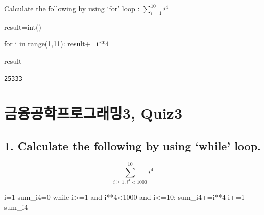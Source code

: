 \documentclass[
  letterpaper,
  DIV=11,
  numbers=noendperiod]{scrreprt}
\newenvironment{Shaded}{\begin{snugshade}}{\end{snugshade}}
\newcommand{\BuiltInTok}[1]{\textcolor[rgb]{0.00,0.23,0.31}{#1}}
\newcommand{\ControlFlowTok}[1]{\textcolor[rgb]{0.00,0.23,0.31}{#1}}
\newcommand{\DecValTok}[1]{\textcolor[rgb]{0.68,0.00,0.00}{#1}}
\newcommand{\KeywordTok}[1]{\textcolor[rgb]{0.00,0.23,0.31}{#1}}
\newcommand{\NormalTok}[1]{\textcolor[rgb]{0.00,0.23,0.31}{#1}}
\newcommand{\OperatorTok}[1]{\textcolor[rgb]{0.37,0.37,0.37}{#1}}
\begin{document}
Calculate the following by using `for' loop : \(\sum_{i=1}^{10} i^4\)

\begin{Shaded}
\begin{Highlighting}[]
\NormalTok{result}\OperatorTok{=}\BuiltInTok{int}\NormalTok{()}

\ControlFlowTok{for}\NormalTok{ i }\KeywordTok{in} \BuiltInTok{range}\NormalTok{(}\DecValTok{1}\NormalTok{,}\DecValTok{11}\NormalTok{):}
\NormalTok{    result}\OperatorTok{+=}\NormalTok{i}\OperatorTok{**}\DecValTok{4}

\NormalTok{result}
\end{Highlighting}
\end{Shaded}

\begin{verbatim}
25333
\end{verbatim}

\chapter*{금융공학프로그래밍3,
Quiz3}\label{uxae08uxc735uxacf5uxd559uxd504uxb85cuxadf8uxb798uxbc0d3-quiz3}


\section*{1. Calculate the following by using `while'
loop.}\label{calculate-the-following-by-using-while-loop.}


\[\sum_{i\geq 1, i^4<1000}^{10}i^4\]

\begin{Shaded}
\begin{Highlighting}[]
\NormalTok{i}\OperatorTok{=}\DecValTok{1}
\NormalTok{sum\_i4}\OperatorTok{=}\DecValTok{0}
\ControlFlowTok{while}\NormalTok{ i}\OperatorTok{\textgreater{}=}\DecValTok{1} \KeywordTok{and}\NormalTok{ i}\OperatorTok{**}\DecValTok{4}\OperatorTok{\textless{}}\DecValTok{1000} \KeywordTok{and}\NormalTok{ i}\OperatorTok{\textless{}=}\DecValTok{10}\NormalTok{:}
\NormalTok{    sum\_i4}\OperatorTok{+=}\NormalTok{i}\OperatorTok{**}\DecValTok{4}
\NormalTok{    i}\OperatorTok{+=}\DecValTok{1}
\NormalTok{sum\_i4}
\end{Highlighting}
\end{Shaded}
\end{document}
